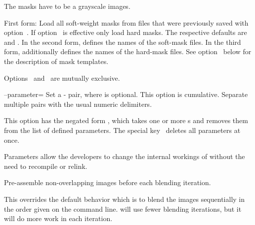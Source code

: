 \begin{codelist}
    The masks have to be a grayscale images.

    \begin{sloppypar}
      First form: Load all soft-weight masks from files that were
      previously saved with option~.  If
      option~ is effective only load hard masks.
      The respective defaults are
      \mbox{} and
      \mbox{}.  In the second form,
       defines the names of the
      soft-mask files.  In the third form,
       additionally defines the
      names of the hard-mask files.  See option~
      below for the description of mask templates.
    \end{sloppypar}

    Options~ and~ are
    mutually exclusive.
\fi


  \label{opt:parameter}%
\item[--parameter=\metavar{KEY}\optional{=\metavar{VALUE}}\optional{:\dots}]\itemend
  Set a - pair, where  is
  optional.  This option is cumulative.  Separate multiple pairs with
  the usual numeric delimiters.

  This option has the negated form
  ,
  which takes one or more s and removes them from the
  list of defined parameters.  The special key~\sample{*} deletes all
  parameters at once.

  Parameters allow the developers to change the internal workings of
  \App{} without the need to recompile or relink.


\ifenblend
  \label{opt:pre-assemble}%
  \item[\itempar{-a \\ --pre-assemble}]\itemend
    Pre-assemble non-overlapping images before each blending
    iteration.

    This overrides the default behavior which is to blend the images
    sequentially in the order given on the command line.  \App{} will
    use fewer blending iterations, but it will do more work in each
    iteration.


\end{codelist}
